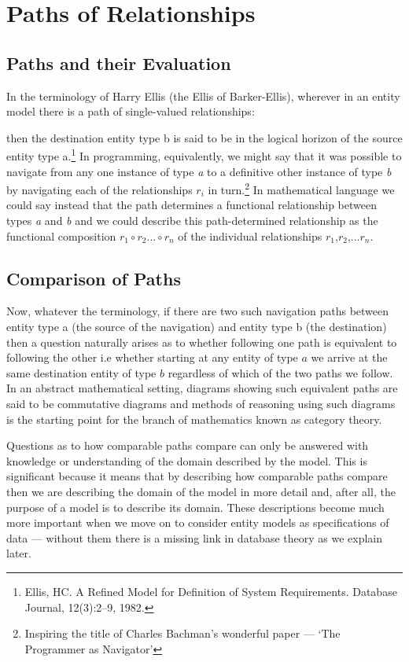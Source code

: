 
\section{Paths of Relationships}
\label{PathsofRelationships}
\subsection{Paths and their Evaluation}
\mynote
In the terminology of Harry Ellis (the Ellis of Barker-Ellis), wherever in an entity model there is a path of single-valued relationships:
\begin{center}

\end{center}
then the destination entity type b is said to be in the logical horizon of the source entity type a.\footnote{Ellis, HC. A Refined Model for Definition of System Requirements. Database Journal, 12(3):2--9, 1982.}
In programming, equivalently, we might say that it was possible to navigate from any one instance of type \textit{a} to a definitive other instance of type \textit{b} by navigating each of the relationships $r_i$ in turn.\footnote{Inspiring the title of Charles Bachman's wonderful paper --- `The Programmer as Navigator'}
 In mathematical language we could say instead that the path determines a functional relationship between types
\textit{a} and \textit{b} and we could describe this path-determined relationship as the functional composition $r_1 \circ r_2 ... \circ r_n$ of the individual relationships $r_1$,$r_2$,...$r_n$.
\subsection{Comparison of Paths}
\mynote
Now, whatever the terminology, if there are two such navigation paths between entity type a (the source
of the navigation) and entity type b (the destination) then a question naturally arises as to whether following one path is equivalent to following the other i.e whether starting at any entity of type $a$ we arrive at the same destination entity of type $b$ regardless of which of the two paths we follow. In an abstract mathematical setting, diagrams showing such equivalent paths are said to be commutative diagrams and methods of reasoning using such diagrams is the starting point for the branch of mathematics known as category theory.

\mynote
Questions as to how comparable paths compare can only be answered with knowledge or understanding of the domain described by the model. This is significant because it means that by describing how comparable paths compare then we are describing the domain of the model in more detail and, after all, the purpose of a model is to describe its domain. 
These descriptions become much more important when we move on to consider entity models as specifications of data --- without them there is a missing link in database theory as we explain later. 

